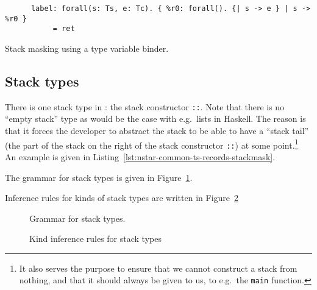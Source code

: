 \begin{listing}[htb]
  \centering
  \begin{minipage}{0.90\textwidth}
    \begin{verbatim}
      label: forall(s: Ts, e: Tc). { %r0: forall(). {| s -> e } | s -> %r0 }
           = ret
    \end{verbatim}
  \end{minipage}
  \caption{Stack masking using a type variable binder.}
  \label{lst:nstar-common-ts-records-stackmask}
\end{listing}

\subsection{Stack types}\label{subsec:nstar-common-ts-stack}

There is one stack type in \nstar: the stack constructor \texttt{::}.
Note that there is no ``empty stack'' type as would be the case with e.g.\ lists in Haskell.
The reason is that it forces the developer to abstract the stack to be able to have a ``stack tail'' (the part of the stack on the right of the stack constructor \texttt{::}) at some point.\footnote{It also serves the purpose to ensure that we cannot construct a stack from nothing, and that it should always be given to us, to e.g.\ the \texttt{main} function.}
An example is given in Listing~\ref{lst:nstar-common-ts-records-stackmask}.

The grammar for stack types is given in Figure~\ref{fig:nstar-common-ts-stack-types-syntax}.

Inference rules for kinds of stack types are written in Figure~\ref{fig:nstar-common-ts-stack-types-kindrules}

\begin{figure}[htb]
  \centering
  \caption{Grammar for stack types.}
  \label{fig:nstar-common-ts-stack-types-syntax}
\end{figure}

\begin{figure}[H]
  \centering


  \caption{Kind inference rules for stack types}
  \label{fig:nstar-common-ts-stack-types-kindrules}
\end{figure}


